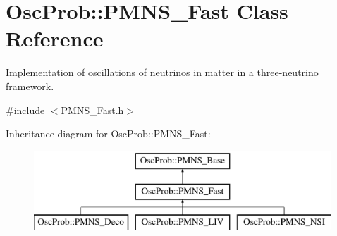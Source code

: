 \hypertarget{classOscProb_1_1PMNS__Fast}{}\section{Osc\+Prob\+:\+:P\+M\+N\+S\+\_\+\+Fast Class Reference}
\label{classOscProb_1_1PMNS__Fast}


Implementation of oscillations of neutrinos in matter in a three-\/neutrino framework.  




{\ttfamily \#include $<$P\+M\+N\+S\+\_\+\+Fast.\+h$>$}

Inheritance diagram for Osc\+Prob\+:\+:P\+M\+N\+S\+\_\+\+Fast\+:\begin{figure}[H]
\begin{center}
\leavevmode
\includegraphics[height=3.000000cm]{classOscProb_1_1PMNS__Fast}
\end{center}
\end{figure}
